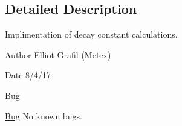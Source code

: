 \subsection{Detailed Description}
Implimentation of decay constant calculations. 

\begin{DoxyAuthor}{Author}
Elliot Grafil (Metex) 
\end{DoxyAuthor}
\begin{DoxyDate}{Date}
8/4/17 
\end{DoxyDate}
\begin{DoxyRefDesc}{Bug}
\item[\hyperlink{bug__bug000022}{Bug}]No known bugs. \end{DoxyRefDesc}
